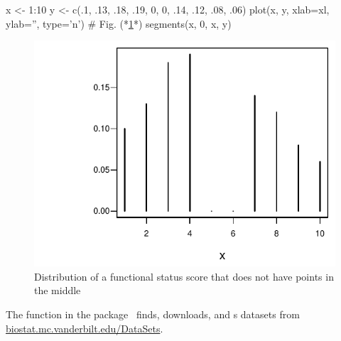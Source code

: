 \begin{Schunk}
\begin{Sinput}
x <- 1:10
y <- c(.1, .13, .18, .19, 0, 0, .14, .12, .08, .06)
plot(x, y, xlab=xl, ylab='', type='n')   # Fig. (*\ref{fig:descript-ordb}*)
segments(x, 0, x, y)
\end{Sinput}
\begin{figure}[htbp]

\centerline{\includegraphics{descript-ordb-1} }

\caption[Ordinal variable with strange distribution]{Distribution of a functional status score that does not have points in the middle}\label{fig:descript-ordb}
\end{figure}
\end{Schunk}
The  function in the  package~\cite{Hmisc}
finds, downloads, and s datasets from
\url{biostat.mc.vanderbilt.edu/DataSets}.
